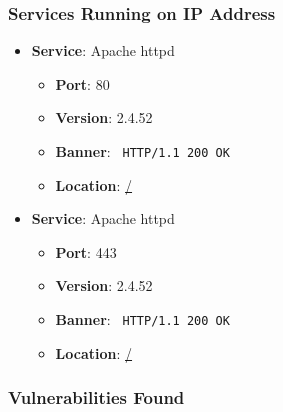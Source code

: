 \documentclass{article}
\begin{document}
\subsubsection*{Services Running on IP Address}

\begin{itemize}
    
        \item \textbf{Service}: Apache httpd
        \begin{itemize}
            \item \textbf{Port}: 80
            \item \textbf{Version}:  2.4.52 
            \item \textbf{Banner}: \texttt{ HTTP/1.1 200 OK
 }
            \item \textbf{Location}: \href{ / }{ / }
        \end{itemize}
    
        \item \textbf{Service}: Apache httpd
        \begin{itemize}
            \item \textbf{Port}: 443
            \item \textbf{Version}:  2.4.52 
            \item \textbf{Banner}: \texttt{ HTTP/1.1 200 OK
 }
            \item \textbf{Location}: \href{ / }{ / }
        \end{itemize}
    
\end{itemize}


\subsubsection*{Vulnerabilities Found}
\end{document}
